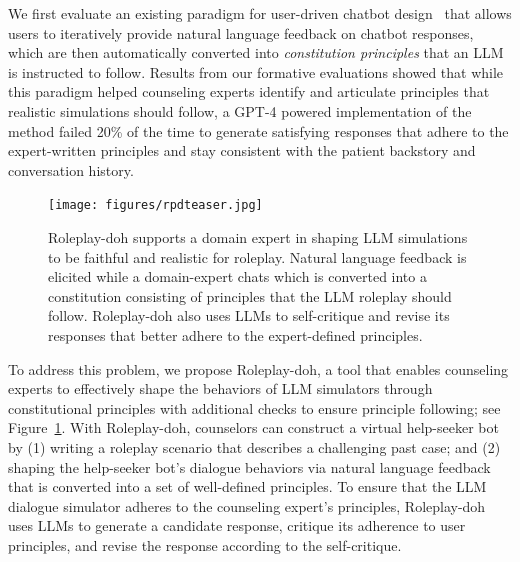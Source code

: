 We first evaluate an existing paradigm for user-driven chatbot design~\cite{petridis2023constitutionmaker} that allows users to iteratively provide natural language feedback on chatbot responses, which are then automatically converted into {\em constitution principles} that an LLM is instructed to follow. Results from our formative evaluations showed that while this paradigm helped counseling experts identify and articulate principles that realistic simulations should follow, a GPT-4 powered implementation of the method failed 20\% of the time to generate satisfying responses that adhere to the expert-written principles and stay consistent with the patient backstory and conversation history. 


\begin{figure}[t]
    \centering
    \texttt{[image: figures/rpdteaser.jpg]}
    \caption{Roleplay-doh supports a domain expert in shaping LLM simulations to be faithful and realistic for roleplay. Natural language feedback is elicited while a domain-expert chats which is converted into a constitution consisting of principles that the LLM roleplay should follow. Roleplay-doh also uses LLMs to self-critique and revise its responses that better adhere to the expert-defined principles.}
    \label{fig:rpdteaser}
\end{figure}

To address this problem, we propose Roleplay-doh, a tool that enables counseling experts to effectively shape the behaviors of LLM simulators through constitutional principles with additional checks to ensure principle following; see Figure~\ref{fig:rpdteaser}. With Roleplay-doh, counselors can construct a virtual help-seeker bot by (1) writing a roleplay scenario that describes a challenging past case; and (2) shaping the help-seeker bot's dialogue behaviors via natural language feedback that is converted into a set of well-defined principles. To ensure that the LLM dialogue simulator adheres to the counseling expert's principles, Roleplay-doh uses LLMs to generate a candidate response, critique its adherence to user principles, and revise the response according to the self-critique. 

